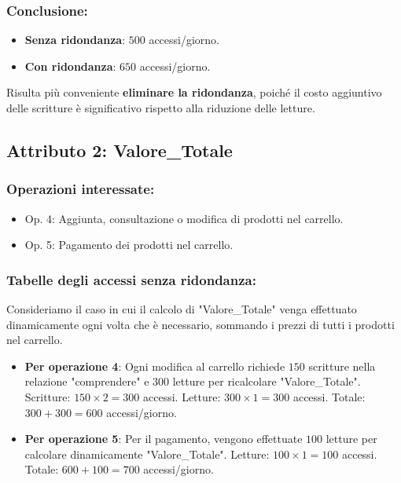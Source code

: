 \documentclass[a4paper,12pt]{report}
\begin{document}
	\subsubsection{Conclusione:}
	\begin{itemize}
		\item \textbf{Senza ridondanza}: $500$ accessi/giorno.
		\item \textbf{Con ridondanza}: $650$ accessi/giorno.
	\end{itemize}
	Risulta più conveniente \textbf{eliminare la ridondanza}, poiché il costo aggiuntivo delle scritture è significativo rispetto alla riduzione delle letture.
	
	\subsection{Attributo 2: Valore\_Totale}
	\subsubsection{Operazioni interessate:}
	\begin{itemize}
		\item Op. 4: Aggiunta, consultazione o modifica di prodotti nel carrello.
		\item Op. 5: Pagamento dei prodotti nel carrello.
	\end{itemize}
	
	\subsubsection{Tabelle degli accessi senza ridondanza:}
	Consideriamo il caso in cui il calcolo di "Valore\_Totale" venga effettuato dinamicamente ogni volta che è necessario, sommando i prezzi di tutti i prodotti nel carrello.
	
	\begin{itemize}
		\item \textbf{Per operazione 4}: Ogni modifica al carrello richiede $150$ scritture nella relazione "comprendere" e $300$ letture per ricalcolare "Valore\_Totale". Scritture: $150 \times 2 = 300$ accessi. Letture: $300 \times 1 = 300$ accessi. Totale: $300 + 300 = 600$ accessi/giorno.
		\item \textbf{Per operazione 5}: Per il pagamento, vengono effettuate $100$ letture per calcolare dinamicamente "Valore\_Totale". Letture: $100 \times 1 = 100$ accessi. Totale: $600 + 100 = 700$ accessi/giorno.
	\end{itemize}
	
\end{document}
